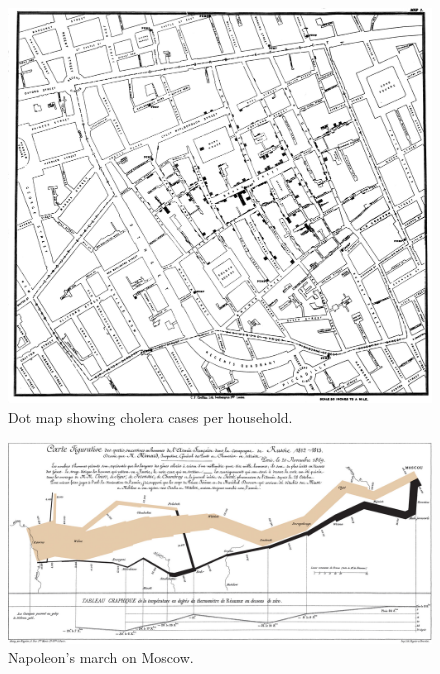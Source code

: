 \documentclass[a4paper, 10pt, titlepage, twocolumn, onehalfspace]{article}
\begin{document}
\begin{figure}[hbt]
  \begin{center}
    \includegraphics[width=4.5in]{snow.jpg}
  \end{center}
  \caption{\small Dot map showing cholera cases per household. }
  \label{fig:dotmap}
\end{figure}
\begin{figure}[hbt]
  \begin{center}
    \includegraphics[width=4.5in]{Minard.png}
  \end{center}
  \caption{\small Napoleon's march on Moscow.}
  \label{fig:march}
\end{figure}
\end{document}
